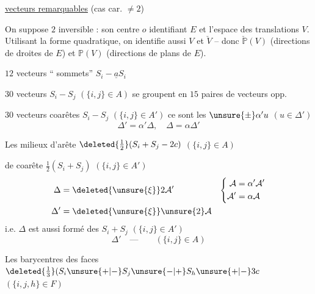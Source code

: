 \uline{vecteurs remarquables}  (cas car. $\ne2$)

On suppose $2$ inversible : son centre $o$ identifiant $E$ et l'espace des translations $V$. Utilisant la forme quadratique, on identifie aussi $V$ et $\check V$ -- donc $\check{\mathbb P}(V)$ (directions de droites de $E$) et $\mathbb P(V)$ (directions de plans de $E$).

$12$ vecteurs `` sommets'' $\boxed{S_i-\underline aS_i}$

\margin{$\Delta$}
$30$ vecteurs   $S_i-S_j$ $(\{i,j\}\in A)$ se groupent en $15$ paires de vecteurs opp.

$30$ vecteurs coarêtes $S_i-S_j$ $(\{i,j\}\in A')$ ce sont les $\unsure{\pm}\alpha'u$ $(u\in\Delta')$
\[
\boxed{\Delta'=\alpha'\Delta,\quad\Delta=\alpha\Delta'}
\]
\diagram{\begin{tikzcd}[ampersand replacement=\&]
{}\arrow[r]\&{}\\
{}\arrow[u]\arrow[r]\&{}\arrow[u]
\end{tikzcd}}

\margin{$\left[\begin{matrix}\mathcal A\\\mathcal A'\end{matrix}\right.$}
Les  milieux d'arête $\deleted{\tfrac12}(S_i+S_j-2c)$ $(\{i,j\}\in A)$

\unsure{---}  de coarête $\frac12(S_i+S_j)$ $(\{i,j\}\in A')$
\[
\begin{aligned}
\Delta&=\deleted{\unsure{\xi}}2\mathcal A'&\left\{\begin{aligned}\mathcal A&=\alpha'\mathcal A'\\\mathcal A'&=\alpha\mathcal A\end{aligned}\right.\\
\Delta'&=\deleted{\unsure{\xi}}\unsure{2}\mathcal A
\end{aligned}
\]
i.e. $\Delta$ est aussi formé des $S_i+S_j$ $(\{i,j\}\in A')$
\[
\Delta'\quad\text{---}\qquad(\{i,j\}\in A)
\]

\margin{$\Phi$}
Les  barycentres des faces $\deleted{\tfrac13}(S_i\unsure{+|-}S_j\unsure{-|+}S_h\unsure{+|-}3c$ $(\{i,j,h\}\in F)$


